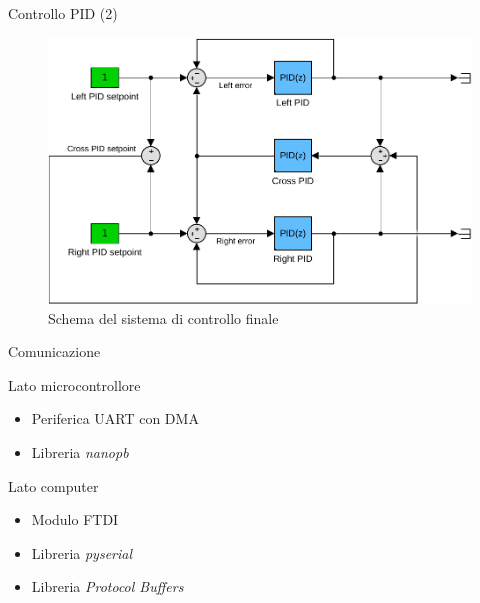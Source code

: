 \documentclass{beamer}
\begin{document}
\begin{tframe}{Controllo PID (2)}
\begin{figure}
    \centering
    \includegraphics[width=0.8\columnwidth]{img/crosspid.pdf}
    \caption*{Schema del sistema di controllo finale}
\end{figure}
\end{tframe}


\begin{tframe}{Comunicazione}

\begin{block}{Lato microcontrollore}
\begin{itemize}
    \item Periferica UART con DMA 
    \item Libreria \textit{nanopb} 
\end{itemize}
\end{block}

\begin{block}{Lato computer}
\begin{itemize}
    \item Modulo FTDI
    \item Libreria \textit{pyserial}
    \item Libreria \textit{Protocol Buffers}
\end{itemize}
\end{block}
\end{tframe}
\end{document}
